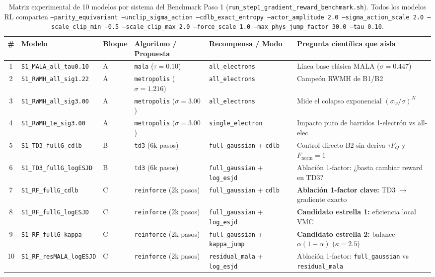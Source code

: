 \documentclass[10pt,a4paper]{article}
\begin{document}
\begin{table}[H]
\centering
\caption{Matriz experimental de 10 modelos por sistema del Benchmark Paso 1 (\texttt{run\_step1\_gradient\_reward\_benchmark.sh}). Todos los modelos RL comparten \texttt{--parity\_equivariant --unclip\_sigma\_action --cdlb\_exact\_entropy --actor\_amplitude 2.0 --sigma\_action\_scale 2.0 --scale\_clip\_min -0.5 --scale\_clip\_max 2.0 --force\_scale 1.0 --max\_phys\_jump\_factor 30.0 --tau 0.10}.}
\label{tab:matrix_step1}
\begin{adjustbox}{max width=\textwidth}
\begin{tabular}{clllll}
\toprule
\textbf{\#} & \textbf{Modelo} & \textbf{Bloque} & \textbf{Algoritmo / Propuesta} & \textbf{Recompensa / Modo} & \textbf{Pregunta científica que aísla} \\
\midrule
1 & \texttt{S1\_MALA\_all\_tau0.10} & A & \texttt{mala} ($\tau=0.10$) & \texttt{all\_electrons} & Línea base clásica MALA ($\sigma=0.447$) \\
2 & \texttt{S1\_RWMH\_all\_sig1.22} & A & \texttt{metropolis} ($\sigma=1.216$) & \texttt{all\_electrons} & Campeón RWMH de B1/B2 \\
3 & \texttt{S1\_RWMH\_all\_sig3.00} & A & \texttt{metropolis} ($\sigma=3.00$) & \texttt{all\_electrons} & Mide el colapso exponencial $(\sigma_w/\sigma)^N$ \\
4 & \texttt{S1\_RWMH\_1e\_sig3.00} & A & \texttt{metropolis} ($\sigma=3.00$) & \texttt{single\_electron} & Impacto puro de barridos 1-electrón vs all-elec \\
\midrule
5 & \texttt{S1\_TD3\_fullG\_cdlb} & B & \texttt{td3} ($6\mathrm{k}$ pasos) & \texttt{full\_gaussian} + \texttt{cdlb} & Control directo B2 sin deriva $\tau F_Q$ y $F_{\mathrm{norm}}=1$ \\
6 & \texttt{S1\_TD3\_fullG\_logESJD} & B & \texttt{td3} ($6\mathrm{k}$ pasos) & \texttt{full\_gaussian} + \texttt{log\_esjd} & Ablación 1-factor: ¿basta cambiar reward en TD3? \\
\midrule
7 & \texttt{S1\_RF\_fullG\_cdlb} & C & \texttt{reinforce} ($2\mathrm{k}$ pasos) & \texttt{full\_gaussian} + \texttt{cdlb} & \textbf{Ablación 1-factor clave:} TD3 $\to$ gradiente exacto \\
8 & \texttt{S1\_RF\_fullG\_logESJD} & C & \texttt{reinforce} ($2\mathrm{k}$ pasos) & \texttt{full\_gaussian} + \texttt{log\_esjd} & \textbf{Candidato estrella 1:} eficiencia local VMC \\
9 & \texttt{S1\_RF\_fullG\_kappa} & C & \texttt{reinforce} ($2\mathrm{k}$ pasos) & \texttt{full\_gaussian} + \texttt{kappa\_jump} & \textbf{Candidato estrella 2:} balance $\alpha(1-\alpha)$ ($\kappa=2.5$) \\
10 & \texttt{S1\_RF\_resMALA\_logESJD} & C & \texttt{reinforce} ($2\mathrm{k}$ pasos) & \texttt{residual\_mala} + \texttt{log\_esjd} & Ablación 1-factor: \texttt{full\_gaussian} vs \texttt{residual\_mala} \\
\bottomrule
\end{tabular}
\end{adjustbox}
\end{table}
\end{document}

